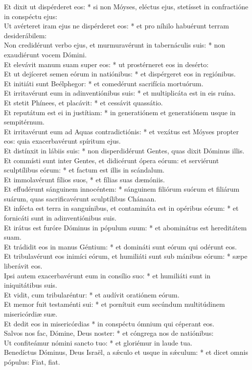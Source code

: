 {	Et dixit ut dispérderet eos: * si non Móyses, eléctus ejus, stetísset in confractióne in conspéctu ejus: \\
	Ut avérteret iram ejus ne dispérderet eos: * et pro níhilo habuérunt terram desiderábilem: \\
	Non credidérunt verbo ejus, et murmuravérunt in tabernáculis suis: * non exaudiérunt vocem Dómini. \\
	Et elevávit manum suam super eos: * ut prostérneret eos in desérto: \\
	Et ut dejíceret semen eórum in natiónibus: * et dispérgeret eos in regiónibus. \\
	Et initiáti sunt Beélphegor: * et comedérunt sacrifícia mortuórum. \\
	Et irritavérunt eum in adinventiónibus suis: * et multiplicáta est in eis ruína. \\
	Et stetit Phínees, et placávit: * et cessávit quassátio. \\
	Et reputátum est ei in justítiam: * in generatiónem et generatiónem usque in sempitérnum. \\
	Et irritavérunt eum ad Aquas contradictiónis: * et vexátus est Móyses propter eos: quia exacerbavérunt spíritum ejus. \\
	Et distínxit in lábiis suis: * non disperdidérunt Gentes, quas dixit Dóminus illis. \\
	Et commísti sunt inter Gentes, et didicérunt ópera eórum: et serviérunt sculptílibus eórum: * et factum est illis in scándalum. \\
	Et immolavérunt fílios suos, * et fílias suas dæmóniis. \\
	Et effudérunt sánguinem innocéntem: * sánguinem filiórum suórum et filiárum suárum, quas sacrificavérunt sculptílibus Chánaan. \\
	Et infécta est terra in sanguínibus, et contamináta est in opéribus eórum: * et fornicáti sunt in adinventiónibus suis. \\
	Et irátus est furóre Dóminus in pópulum suum: * et abominátus est hereditátem suam. \\
	Et trádidit eos in manus Géntium: * et domináti sunt eórum qui odérunt eos. \\
	Et tribulavérunt eos inimíci eórum, et humiliáti sunt sub mánibus eórum: * sæpe liberávit eos. \\
	Ipsi autem exacerbavérunt eum in consílio suo: * et humiliáti sunt in iniquitátibus suis. \\
	Et vidit, cum tribularéntur: * et audívit oratiónem eórum. \\
	Et memor fuit testaménti sui: * et pœnítuit eum secúndum multitúdinem misericórdiæ suæ. \\
	Et dedit eos in misericórdias * in conspéctu ómnium qui céperant eos. \\
	Salvos nos fac, Dómine, Deus noster: * et cóngrega nos de natiónibus: \\
	Ut confiteámur nómini sancto tuo: * et gloriémur in laude tua. \\
	Benedíctus Dóminus, Deus Israël, a sǽculo et usque in sǽculum: * et dicet omnis pópulus: Fiat, fiat. \\
}

